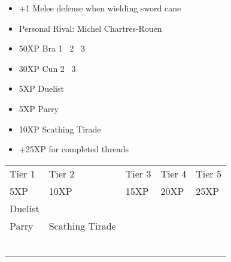 \documentclass{article}
\begin{document}
\vspace{2em}



\begin{itemize}
    \item +1 Melee defense when wielding sword cane
    \item Personal Rival: Michel Chartres-Rouen
\end{itemize}


\begin{multicols}{2}
\setlength{\columnseprule}{0.3pt}
\begin{itemize}[noitemsep]
\item 50XP Bra 1 \faArrowRight\ 2 \faArrowRight\ 3
\item 30XP Cun 2 \faArrowRight\ 3
\item 5XP Duelist
\item 5XP Parry
\item 10XP Scathing Tirade
\item +25XP for completed threads
\end{itemize}
\end{multicols}


\vspace*{\fill}

\hfill{}


\pagebreak


\noindent\begin{tabu} to 
\rowfont{\bfseries\sffamily\centering} Tier 1 & Tier 2 & Tier 3 & Tier 4 & Tier 5\\
\rowfont{\small\sffamily\centering} 5XP & 10XP & 15XP & 20XP & 25XP\\
Duelist\\
Parry & Scathing Tirade \\
 &  & \\
 &  & & \\
 &  & & & \\
 &  & & & \\
 &  & & & \\
 &  & & & \\

\end{tabu}
\end{document}
